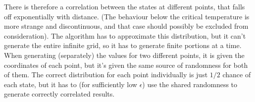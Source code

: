 \documentclass{article}
\begin{document}
There is therefore a correlation between the states at different points, that falls off exponentially with distance. 
(The behaviour below the critical temperature is more strange and discontinuous, and that case should possibly be excluded from consideration). 
The algorithm has to approximate this distribution, but it can't generate the entire infinite grid, so it has to generate finite portions at a time. When generating (separately) the values for two different points, it is given the coordinates of each point, but it's given the same source of randomness for both of them. 
The correct distribution for each point individually is just $1/2$ chance of each state, but it has to (for sufficiently low $\epsilon$) use the shared randomness to generate correctly correlated results.
\end{document}
